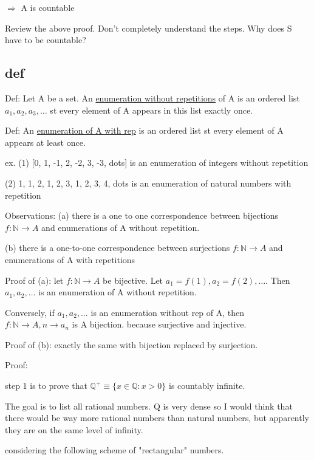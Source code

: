 \documentclass{article}
\begin{document}
 $\Rightarrow$ A is countable

 Review the above proof. Don't completely understand the steps. Why does S have to be countable?


 \subsection{def}

 Def: Let A be a set. An \underline{enumeration without repetitions} of A is an ordered list $a_1, a_2, a_3, \dots$ st every element of A appears in this list exactly once.

 Def: An \underline{enumeration of A with rep} is an ordered list st every element of A appears at least once.

 ex. (1) [0, 1, -1, 2, -2, 3, -3, dots] is an enumeration of integers without repetition

 (2) 1, 1, 2, 1, 2, 3, 1, 2, 3, 4, dots is an enumeration of natural numbers with repetition

 Observations: (a) there is a one to one correspondence between bijections $f: \mathbb{N} \to A$ and enumerations of A without repetition.

 (b) there is a one-to-one correspondence between surjections $f: \mathbb{N} \to A$ and enumerations of A with repetitions


 Proof of (a): let $f: \mathbb{N} \to A$ be bijective. Let $a_1 = f(1), a_2 = f(2), \dots$. Then $a_1, a_2, \dots$ is an enumeration of A without repetition.

 Conversely, if $a_1, a_2, \dots$ is an enumeration without rep of A, then $f: \mathbb{N} \to A, n \to a_n$ is A bijection. because surjective and injective.

 Proof of (b): exactly the same with bijection replaced by surjection.


 Proof:

 step 1 is to prove that $\mathbb{Q}^+ \equiv \{x \in \mathbb{Q}: x > 0 \}$ is countably infinite.

 The goal is to list all rational numbers. Q is very dense so I would think that there would be way more rational numbers than natural numbers, but apparently they are on the same level of infinity.

 considering the following scheme of "rectangular" numbers.
\end{document}
